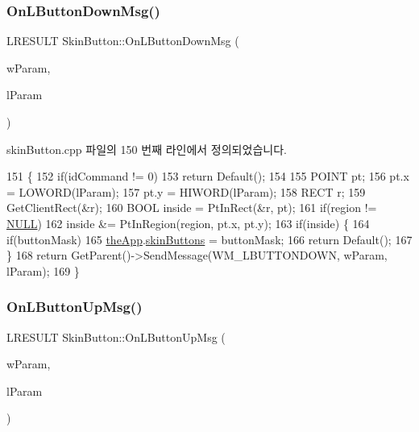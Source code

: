 \subsubsection{\texorpdfstring{On\+L\+Button\+Down\+Msg()}{OnLButtonDownMsg()}}
{\footnotesize\ttfamily L\+R\+E\+S\+U\+LT Skin\+Button\+::\+On\+L\+Button\+Down\+Msg (\begin{DoxyParamCaption}\item[{W\+P\+A\+R\+AM}]{w\+Param,  }\item[{L\+P\+A\+R\+AM}]{l\+Param }\end{DoxyParamCaption})}



skin\+Button.\+cpp 파일의 150 번째 라인에서 정의되었습니다.


\begin{DoxyCode}
151 \{
152   \textcolor{keywordflow}{if}(idCommand != 0)
153     \textcolor{keywordflow}{return} Default();
154 
155   POINT pt;
156   pt.x = LOWORD(lParam);
157   pt.y = HIWORD(lParam);
158   RECT r;
159   GetClientRect(&r);
160   BOOL inside = PtInRect(&r, pt);
161   \textcolor{keywordflow}{if}(region != \mbox{\hyperlink{getopt1_8c_a070d2ce7b6bb7e5c05602aa8c308d0c4}{NULL}})
162     inside &= PtInRegion(region, pt.x, pt.y);
163   \textcolor{keywordflow}{if}(inside) \{
164     \textcolor{keywordflow}{if}(buttonMask)
165       \mbox{\hyperlink{_v_b_a_8cpp_a8095a9d06b37a7efe3723f3218ad8fb3}{theApp}}.\mbox{\hyperlink{class_v_b_a_a18dd81b37aa33a8f580a2dabe358a280}{skinButtons}} = buttonMask;
166     \textcolor{keywordflow}{return} Default();
167   \}
168   \textcolor{keywordflow}{return} GetParent()->SendMessage(WM\_LBUTTONDOWN, wParam, lParam);
169 \}
\end{DoxyCode}
\mbox{\label{class_skin_button_a698952f37a3b9b3dbc3341260c7737bc}} 
\subsubsection{\texorpdfstring{On\+L\+Button\+Up\+Msg()}{OnLButtonUpMsg()}}
{\footnotesize\ttfamily L\+R\+E\+S\+U\+LT Skin\+Button\+::\+On\+L\+Button\+Up\+Msg (\begin{DoxyParamCaption}\item[{W\+P\+A\+R\+AM}]{w\+Param,  }\item[{L\+P\+A\+R\+AM}]{l\+Param }\end{DoxyParamCaption})}



